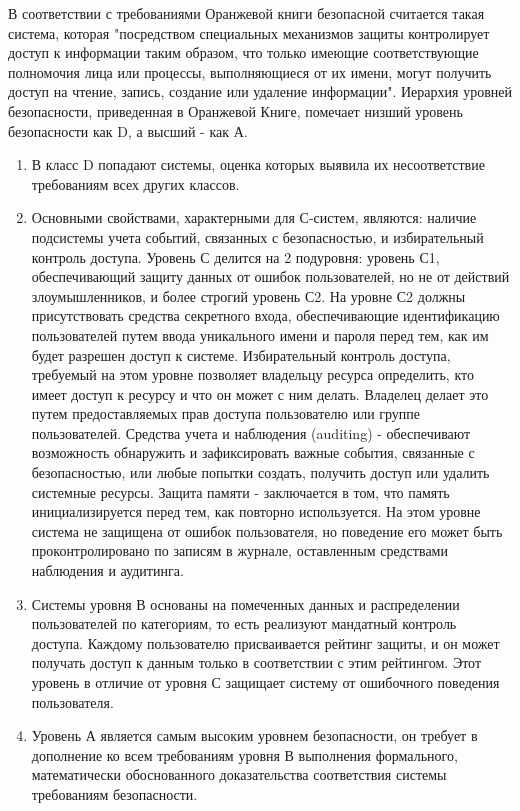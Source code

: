 В соответствии с требованиями Оранжевой книги безопасной считается такая система, которая "посредством специальных механизмов защиты контролирует доступ к информации таким образом, что только имеющие соответствующие полномочия лица или процессы, выполняющиеся от их имени, могут получить доступ на чтение, запись, создание или удаление информации".
\newpage
Иерархия уровней безопасности, приведенная в Оранжевой Книге, помечает низший уровень безопасности как D, а высший - как А.
\begin{enumerate}
   \item В класс D попадают системы, оценка которых выявила их несоответствие требованиям всех других классов.
   \item Основными свойствами, характерными для С-систем, являются: наличие подсистемы учета событий, связанных с безопасностью, и избирательный контроль доступа. Уровень С делится на 2 подуровня: уровень С1, обеспечивающий защиту данных от ошибок пользователей, но не от действий злоумышленников, и более строгий уровень С2. На уровне С2 должны присутствовать средства секретного входа, обеспечивающие идентификацию пользователей путем ввода уникального имени и пароля перед тем, как им будет разрешен доступ к системе. Избирательный контроль доступа, требуемый на этом уровне позволяет владельцу ресурса определить, кто имеет доступ к ресурсу и что он может с ним делать. Владелец делает это путем предоставляемых прав доступа пользователю или группе пользователей. Средства учета и наблюдения (auditing) - обеспечивают возможность обнаружить и зафиксировать важные события, связанные с безопасностью, или любые попытки создать, получить доступ или удалить системные ресурсы. Защита памяти - заключается в том, что память инициализируется перед тем, как повторно используется. На этом уровне система не защищена от ошибок пользователя, но поведение его может быть проконтролировано по записям в журнале, оставленным средствами наблюдения и аудитинга.
   \item Системы уровня В основаны на помеченных данных и распределении пользователей по категориям, то есть реализуют мандатный контроль доступа. Каждому пользователю присваивается рейтинг защиты, и он может получать доступ к данным только в соответствии с этим рейтингом. Этот уровень в отличие от уровня С защищает систему от ошибочного поведения пользователя.
   \item Уровень А является самым высоким уровнем безопасности, он требует в дополнение ко всем требованиям уровня В выполнения формального, математически обоснованного доказательства соответствия системы требованиям безопасности.

\end{enumerate}


